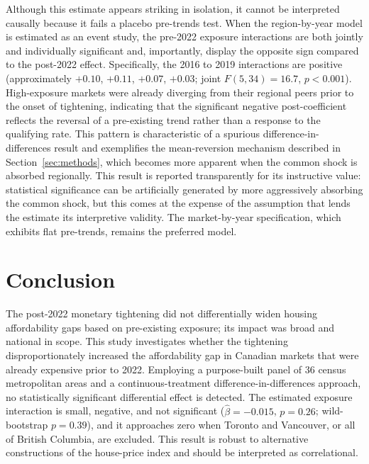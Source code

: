 \documentclass[12pt]{article}
\begin{document}
Although this estimate appears striking in isolation, it cannot be interpreted causally because it fails a placebo pre-trends test. When the region-by-year model is estimated as an event study, the pre-2022 exposure interactions are both jointly and individually significant and, importantly, display the opposite sign compared to the post-2022 effect. Specifically, the 2016 to 2019 interactions are positive (approximately $+0.10$, $+0.11$, $+0.07$, $+0.03$; joint $F(5,34)=16.7$, $p<0.001$). High-exposure markets were already diverging from their regional peers prior to the onset of tightening, indicating that the significant negative post-coefficient reflects the reversal of a pre-existing trend rather than a response to the qualifying rate. This pattern is characteristic of a spurious difference-in-differences result and exemplifies the mean-reversion mechanism described in Section~\ref{sec:methods}, which becomes more apparent when the common shock is absorbed regionally. This result is reported transparently for its instructive value: statistical significance can be artificially generated by more aggressively absorbing the common shock, but this comes at the expense of the assumption that lends the estimate its interpretive validity. The market-by-year specification, which exhibits flat pre-trends, remains the preferred model.



\section{Conclusion}

The post-2022 monetary tightening did not differentially widen housing affordability gaps based on pre-existing exposure; its impact was broad and national in scope. This study investigates whether the tightening disproportionately increased the affordability gap in Canadian markets that were already expensive prior to 2022. Employing a purpose-built panel of 36 census metropolitan areas and a continuous-treatment difference-in-differences approach, no statistically significant differential effect is detected. The estimated exposure interaction is small, negative, and not significant ($\hat{\beta}=-0.015$, $p=0.26$; wild-bootstrap $p=0.39$), and it approaches zero when Toronto and Vancouver, or all of British Columbia, are excluded. This result is robust to alternative constructions of the house-price index and should be interpreted as correlational.
\end{document}

